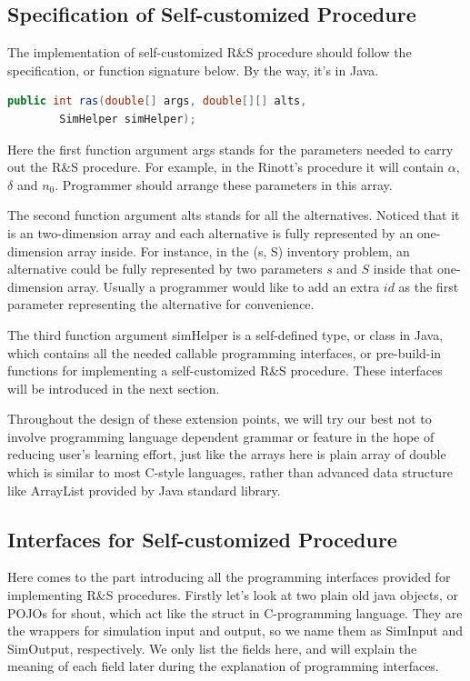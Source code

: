 \documentclass[12pt,a4]{report}
\begin{document}
\subsection{Specification of Self-customized Procedure}

The implementation of self-customized R\&S procedure should follow the specification, or function signature below. By the way, it's in Java.

\begin{lstlisting}[language=Java]
public int ras(double[] args, double[][] alts,
        SimHelper simHelper);
\end{lstlisting}

Here the first function argument args stands for the parameters needed to carry out the R\&S procedure. For example, in the Rinott's procedure it will contain $\alpha$, $\delta$ and $n_0$. Programmer should arrange these parameters in this array.

The second function argument alts stands for all the alternatives. Noticed that it is an two-dimension array and each alternative is fully represented by an one-dimension array inside. For instance, in the (s, S) inventory problem, an alternative could be fully represented by two parameters $s$ and $S$ inside that one-dimension array. Usually a programmer would like to add an extra $id$ as the first parameter representing the alternative for convenience.

The third function argument simHelper is a self-defined type, or class in Java, which contains all the needed callable programming interfaces, or pre-build-in functions for implementing a self-customized R\&S procedure. These interfaces will be introduced in the next section.

Throughout the design of these extension points, we will try our best not to involve programming language dependent grammar or feature in the hope of reducing user's learning effort, just like the arrays here is plain array of double which is similar to most C-style languages, rather than advanced data structure like ArrayList provided by Java standard library.

\subsection{Interfaces for Self-customized Procedure}

Here comes to the part introducing all the programming interfaces provided for implementing R\&S procedures. Firstly let's look at two plain old java objects, or POJOs for shout, which act like the struct in C-programming language. They are the wrappers for simulation input and output, so we name them as SimInput and SimOutput, respectively. We only list the fields here, and will explain the meaning of each field later during the explanation of programming interfaces.
\end{document}
